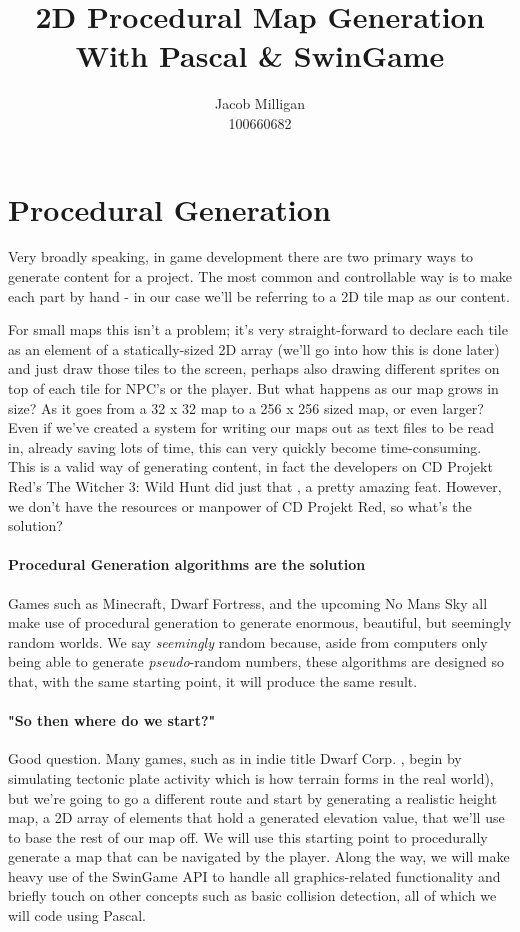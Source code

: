 \documentclass{article}
\title{2D Procedural Map Generation \\ \large With Pascal \& SwinGame}
\author{Jacob Milligan \\ 100660682}
\date{}
\begin{document}
\maketitle
	
	
\section{Procedural Generation}

Very broadly speaking, in game development there are two primary ways to generate content for a project. The most common and controllable way is to make each part by hand - in our 			case we'll be referring to a 2D tile map as our content.
		
For small maps this isn't a problem; it's very straight-forward to declare each tile as an element of a statically-sized 2D array (we'll go into how this is done later) and just draw those tiles 	to the screen, perhaps also drawing different sprites on top of each tile for NPC's or the player. But what happens as our map grows in size? As it goes from a 32 x 32 map to a 256 x 256 sized map, or even larger? Even if we've created a system for writing our maps out as text files to be read in, already saving lots of time, this can very quickly become time-consuming. This is a valid way of generating content, in fact the developers on CD Projekt Red's The Witcher 3: Wild Hunt did just that \parencite[1]{witcher}, a pretty amazing feat. However, we don't have the resources or manpower of CD Projekt Red, so what's the solution?
		
\paragraph{Procedural Generation algorithms are the solution}\mbox{}
		
Games such as Minecraft, Dwarf Fortress, and the upcoming No Mans Sky all make use of procedural generation to generate enormous, beautiful, but seemingly random worlds. We say \emph{seemingly} random because, aside from computers only being able to generate \emph{pseudo}-random numbers, these algorithms are designed so that, with the same starting point, it will produce the same result.
		
\paragraph{"So then where do we start?"}
		
Good question. Many games, such as in indie title Dwarf Corp. \parencite{dwarfcorp}, begin by simulating tectonic plate activity which is how terrain forms in the real world), but we're going to go a different route and start by generating a realistic height map, a 2D array of elements that hold a generated elevation value, that we'll use to base the rest of our map off. We will use this starting point to procedurally generate a map that can be navigated by the player. Along the way, we will make heavy use of the SwinGame API to handle all graphics-related functionality and briefly touch on other concepts such as basic collision detection, all of which we will code using Pascal.
	
\end{document}
